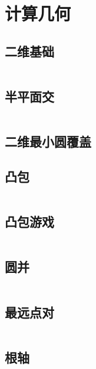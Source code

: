 \chapter{计算几何}
\section{二维基础}
\inputminted{cpp}{./computational_geometry/two_dimensions_basic.cpp}
\section{半平面交}
\inputminted{cpp}{./computational_geometry/half_plane_intersection.cpp}
\section{二维最小圆覆盖}
\section{凸包}
\inputminted{cpp}{./computational_geometry/convex_hull.cpp}
\section{凸包游戏}
\inputminted{cpp}{./computational_geometry/convex_hull_game.cpp}
\section{圆并}
\inputminted{cpp}{./computational_geometry/circle_union.cpp}
\section{最远点对}
\inputminted{cpp}{./computational_geometry/farthest_point_pair.cpp}
\section{根轴}
%